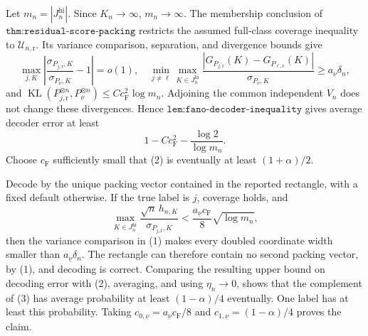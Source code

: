 Let \(m_n=|J_n^{\mathrm{hi}}|\).  Since \(K_n\to\infty\), \(m_n\to\infty\).  The membership conclusion of \(\texttt{thm:residual-score-packing}\) restricts the assumed full-class coverage inequality to \(\mathcal U_{n,\mathrm r}\).  Its variance comparison, separation, and divergence bounds give
\[
 \max_{j,K}\left|\frac{\sigma_{P_{j,\mathrm r},K}}{\sigma_{P_\nu,K}}-1\right|=o(1),
 \quad
 \min_{j\ne\ell}\max_{K\in J_n^{\mathrm{hi}}}
 \frac{|G_{P_{j,\mathrm r}}(K)-G_{P_{\ell,\mathrm r}}(K)|}{\sigma_{P_\nu,K}}
 \geq a_{\underline\nu}\delta_n,                                       \tag{1}
\]
and \(\operatorname{KL}(P_{j,\mathrm r}^{\otimes n},P_\nu^{\otimes n})\leq Cc_{\mathrm F}^2\log m_n\).  Adjoining the common independent \(V_n\) does not change these divergences.  Hence \(\texttt{lem:fano-decoder-inequality}\) gives average decoder error at least
\[
 1-Cc_{\mathrm F}^2-\frac{\log2}{\log m_n}.                              \tag{2}
\]
Choose \(c_{\mathrm F}\) sufficiently small that (2) is eventually at least \((1+\alpha)/2\).

Decode by the unique packing vector contained in the reported rectangle, with a fixed default otherwise.  If the true label is \(j\), coverage holds, and
\[
 \max_{K\in J_n^{\mathrm{hi}}}\frac{\sqrt n\,h_{n,K}}{\sigma_{P_{j,\mathrm r},K}}
 <\frac{a_{\underline\nu}c_{\mathrm F}}8\sqrt{\log m_n},                \tag{3}
\]
then the variance comparison in (1) makes every doubled coordinate width smaller than \(a_{\underline\nu}\delta_n\).  The rectangle can therefore contain no second packing vector, by (1), and decoding is correct.  Comparing the resulting upper bound on decoding error with (2), averaging, and using \(\eta_n\to0\), shows that the complement of (3) has average probability at least \((1-\alpha)/4\) eventually.  One label has at least this probability.  Taking \(c_{0,\underline\nu}=a_{\underline\nu}c_{\mathrm F}/8\) and \(c_{1,\underline\nu}=(1-\alpha)/4\) proves the claim.